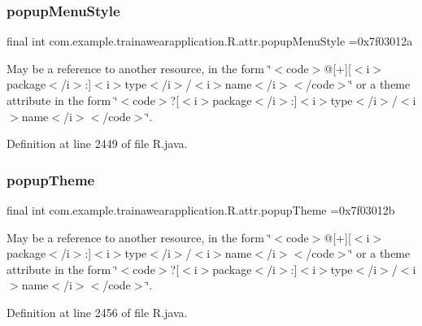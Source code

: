 \subsubsection{\texorpdfstring{popupMenuStyle}{popupMenuStyle}}
{\footnotesize\ttfamily final int com.\+example.\+trainawearapplication.\+R.\+attr.\+popup\+Menu\+Style =0x7f03012a\hspace{0.3cm}{\ttfamily [static]}}

May be a reference to another resource, in the form \char`\"{}$<$code$>$@\mbox{[}+\mbox{]}\mbox{[}$<$i$>$package$<$/i$>$\+:\mbox{]}$<$i$>$type$<$/i$>$/$<$i$>$name$<$/i$>$$<$/code$>$\char`\"{} or a theme attribute in the form \char`\"{}$<$code$>$?\mbox{[}$<$i$>$package$<$/i$>$\+:\mbox{]}$<$i$>$type$<$/i$>$/$<$i$>$name$<$/i$>$$<$/code$>$\char`\"{}. 

Definition at line 2449 of file R.\+java.

\mbox{\label{classcom_1_1example_1_1trainawearapplication_1_1_r_1_1attr_a60e108fec02e62dc5b3a785f63c8e58f}} 
\subsubsection{\texorpdfstring{popupTheme}{popupTheme}}
{\footnotesize\ttfamily final int com.\+example.\+trainawearapplication.\+R.\+attr.\+popup\+Theme =0x7f03012b\hspace{0.3cm}{\ttfamily [static]}}

May be a reference to another resource, in the form \char`\"{}$<$code$>$@\mbox{[}+\mbox{]}\mbox{[}$<$i$>$package$<$/i$>$\+:\mbox{]}$<$i$>$type$<$/i$>$/$<$i$>$name$<$/i$>$$<$/code$>$\char`\"{} or a theme attribute in the form \char`\"{}$<$code$>$?\mbox{[}$<$i$>$package$<$/i$>$\+:\mbox{]}$<$i$>$type$<$/i$>$/$<$i$>$name$<$/i$>$$<$/code$>$\char`\"{}. 

Definition at line 2456 of file R.\+java.

\mbox{\label{classcom_1_1example_1_1trainawearapplication_1_1_r_1_1attr_af46850c70a836bf4c9948db67a5e13e9}} 
